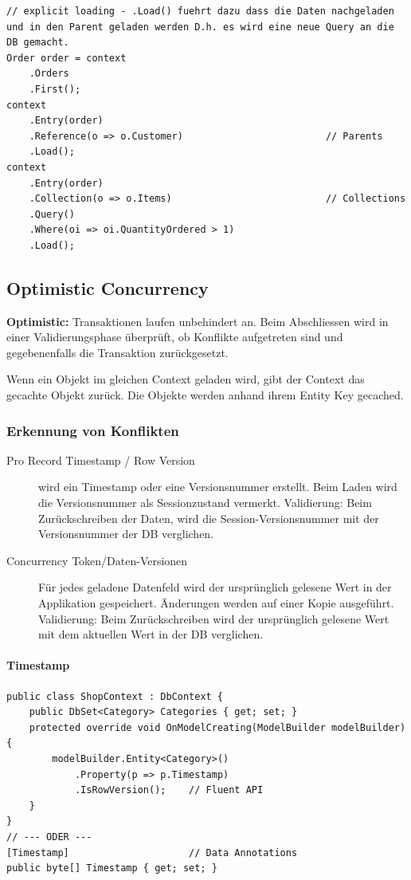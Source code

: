 \documentclass[
a4paper,
oneside,
10pt,
fleqn,
headsepline,
toc=listofnumbered, 
bibliography=totocnumbered]{scrartcl}
\begin{document}
\begin{lstlisting}
// explicit loading - .Load() fuehrt dazu dass die Daten nachgeladen und in den Parent geladen werden D.h. es wird eine neue Query an die DB gemacht.
Order order = context
    .Orders
    .First();
context
    .Entry(order)
    .Reference(o => o.Customer)                         // Parents
    .Load();
context
    .Entry(order)
    .Collection(o => o.Items)                           // Collections
    .Query()
    .Where(oi => oi.QuantityOrdered > 1)
    .Load();
\end{lstlisting}

\subsection{Optimistic Concurrency}

\textbf{Optimistic:} Transaktionen laufen unbehindert an. Beim Abschliessen wird in einer Validierungsphase überprüft, ob Konflikte aufgetreten sind und gegebenenfalls die Transaktion zurückgesetzt.

Wenn ein Objekt im gleichen Context geladen wird, gibt der Context das gecachte Objekt zurück.
Die Objekte werden anhand ihrem Entity Key gecached.

\subsubsection{Erkennung von Konflikten}
\begin{description}
    \item[Pro Record Timestamp / Row Version] wird ein Timestamp oder eine Versionsnummer erstellt. Beim Laden wird die Versionsnummer als Sessionzustand vermerkt. Validierung: Beim Zurückschreiben der Daten, wird die Session-Versionsnummer mit der Versionsnummer der DB verglichen.
    \item[Concurrency Token/Daten-Versionen] Für jedes geladene Datenfeld wird der ursprünglich gelesene Wert in der Applikation gespeichert. Änderungen werden auf einer Kopie ausgeführt. Validierung: Beim Zurückschreiben wird der ursprünglich gelesene Wert mit dem aktuellen Wert in der DB verglichen.
\end{description}

\paragraph{Timestamp}
\begin{lstlisting}
public class ShopContext : DbContext {
    public DbSet<Category> Categories { get; set; }
    protected override void OnModelCreating(ModelBuilder modelBuilder) {
        modelBuilder.Entity<Category>()
            .Property(p => p.Timestamp)
            .IsRowVersion();    // Fluent API
    }
}
// --- ODER ---
[Timestamp]                     // Data Annotations
public byte[] Timestamp { get; set; }
\end{lstlisting}
\end{document}

